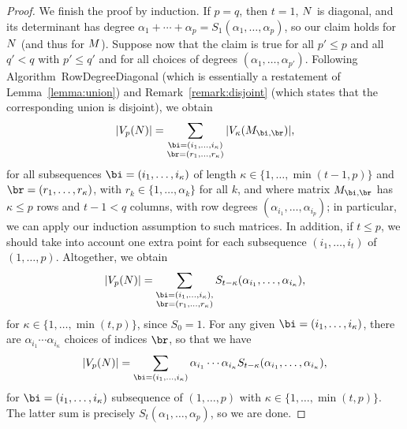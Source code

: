 \documentclass[12pt]{article}
\begin{document}
\begin{proof}
  We finish the proof by induction. If $p=q$, then $t=1$, ${N}$ is diagonal, and
  its determinant has degree $\alpha_1 + \cdots + \alpha_p =
  S_1(\alpha_1,\dots,\alpha_p)$, so our claim holds for ${N}$ (and
  thus for ${M}$). Suppose now that the claim is true  for all $p'\le p$ and all $q' < q$ with $p'
  \le q'$ and for all choices
  of degrees $(\alpha_1,\dots,\alpha_{p'})$. Following Algorithm~{\sf RowDegreeDiagonal}
  (which is essentially a restatement of Lemma~\ref{lemma:union}) and Remark~\ref{remark:disjoint} 
  (which states that the corresponding union is disjoint), we obtain
  $$
  |V_p(\mN)| = \sum_{\substack{\bi=(i_1,\dots,i_\kappa)\\\br=(r_1,\dots,r_\kappa)}}  |V_\kappa(\mM_{\bi,\br})|,
  $$ for all subsequences $\bi=(i_1,\dots,i_\kappa)$ of length $\kappa
  \in \{1,\dots,\min(t-1,p)\}$ and $\br=(r_1,\dots,r_\kappa)$, with $r_k
  \in \{1,\dots,\alpha_k\}$ for all $k$, and where 
  matrix $\mM_{\bi,\br}$
  has $\kappa \le p$ rows and $t-1 < q$ columns, with row degrees $(\alpha_{i_1},\dots,\alpha_{i_p})$;
  in particular, we can apply our induction assumption to such matrices.
  In addition, if $t \le p$, we should take into account one extra point 
  for each subsequence $(i_1,\dots,i_t)$ of $(1,\dots,p)$. Altogether, 
  we obtain 
  $$
  |V_p(\mN)| = \sum_{\substack{\bi=(i_1,\dots,i_\kappa),\\\br=(r_1,\dots,r_\kappa)}}  S_{t-\kappa}(\alpha_{i_1},\dots,\alpha_{i_\kappa}),
  $$
  for $\kappa \in \{1,\dots,\min(t,p)\}$, since $S_0=1$.
  For any given $\bi=(i_1,\dots,i_\kappa)$, there are $\alpha_{i_1}\cdots \alpha_{i_\kappa}$ 
  choices of indices $\br$, so that we have
  $$
  |V_p(\mN)| = \sum_{\bi=(i_1,\dots,i_\kappa)} \alpha_{i_1}\cdots \alpha_{i_\kappa} S_{t-\kappa}(\alpha_{i_1},\dots,\alpha_{i_\kappa}),
  $$
  for $\bi=(i_1,\dots,i_\kappa)$ subsequence of $(1,\dots,p)$ with $\kappa \in \{1,\dots,\min(t,p)\}$.
  The latter sum is precisely $S_t(\alpha_1,\dots,\alpha_p)$, so we are done.
\end{proof}
\end{document}
